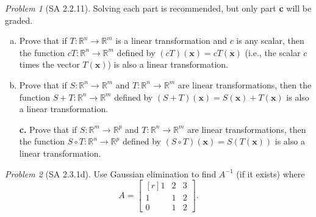 \documentclass[fleqn,11pt]{paper}
\theoremstyle{remark}
\newtheorem{problem}{Problem}
\newtheorem*{solution}{{\bf Solution}}
\newcommand\R{\fld{R}}
\renewcommand{\vec}[1]{\mathbf{#1}}
\newcommand{\<}{\ensuremath{\langle}}
\renewcommand{\>}{\ensuremath{\rangle}}
\newcommand\fld[1]{\ensuremath{\mathbb{#1}}}
\newcommand\vx{\vec{x}}
\begin{document}
\begin{problem}[SA 2.2.11]
Solving each part is recommended, but only part {\bf c} will be graded.
  \begin{enumerate}[a.]
  \item 
    Prove that if $T : \R^n \to \R^m$ is a linear transformation and $c$ is any
    scalar, then the function $cT : \R^n \to \R^m$ defined by 
    $(cT)(\vx) = c T(\vx)$ (i.e., the scalar $c$ times the vector $T(\vx)$) 
    is also a linear transformation.
  \item Prove that if $S : \R^n \to \R^m$ and $T : \R^n \to \R^m$ are linear
    transformations, then the function $S + T : \R^n \to \R^m$ defined by 
    $(S + T)(\vx) = S(\vx) + T (\vx)$ is also a linear transformation.
  \item[{\bf c.}] Prove that if 
    $S : \R^m \to \R^p$ and $T : \R^n \to \R^m$ are linear
    transformations, then the function $S \circ T : \R^n \to \R^p$ defined by
    $(S\circ T)(\vx) = S(T(\vx))$ is also a linear transformation.
  \end{enumerate}
\end{problem}
\newpage


\begin{problem}[SA 2.3.1d]
  Use Gaussian elimination to find $A^{-1}$ (if it exists) where 
  \[
  A = \begin{bmatrix*}[r] 1&2&3\\1&1&2\\0&1&2\end{bmatrix*}.
    \]
\end{problem}
\newpage
\end{document}
